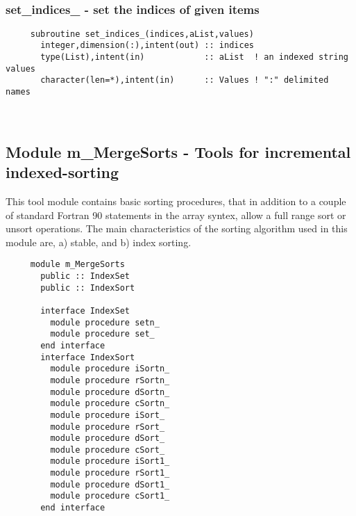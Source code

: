  
\mbox{}\hrulefill\ 
 
  \subsubsection{set\_indices\_ - set the indices of given items}

\begin{verbatim} 
     subroutine set_indices_(indices,aList,values)
       integer,dimension(:),intent(out) :: indices
       type(List),intent(in)            :: aList  ! an indexed string values
       character(len=*),intent(in)      :: Values ! ":" delimited names
 \end{verbatim} %


 
 
\mbox{}\hrulefill\ 
 

  \subsection{Module m\_MergeSorts - Tools for incremental indexed-sorting }

     This tool module contains basic sorting procedures, that in
     addition to a couple of standard Fortran 90 statements in the
     array syntex, allow a full range sort or unsort operations.
     The main characteristics of the sorting algorithm used in this
     module are, a) stable, and b) index sorting.
  
\begin{verbatim} 
     module m_MergeSorts
       public :: IndexSet
       public :: IndexSort
 
       interface IndexSet
         module procedure setn_
         module procedure set_
       end interface
       interface IndexSort
         module procedure iSortn_
         module procedure rSortn_
         module procedure dSortn_
         module procedure cSortn_
         module procedure iSort_
         module procedure rSort_
         module procedure dSort_
         module procedure cSort_
         module procedure iSort1_
         module procedure rSort1_
         module procedure dSort1_
         module procedure cSort1_
       end interface
\end{verbatim}
 
